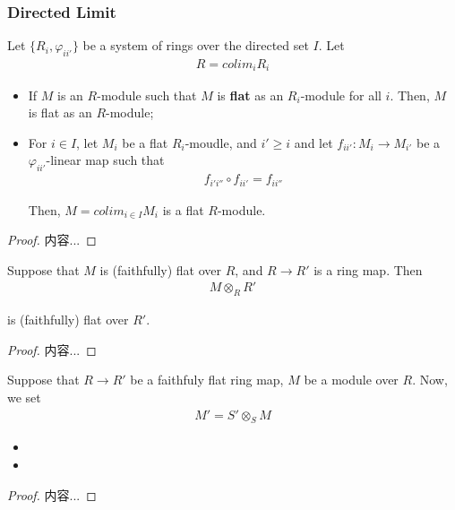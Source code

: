 \documentclass[Total.tex]{subfiles}
\begin{document}
				\subsubsection{Directed Limit}
				\begin{lemma}
					Let $\{R_i,\varphi_{ii'}\}$ be a system of rings over the directed set $I$. Let
					\begin{gather*}
						R=colim_i R_i
					\end{gather*}
					\begin{itemize}
						\item If $M$ is an $R$-module such that $M$ is \textbf{flat} as an $R_i$-module for all $i$. Then, $M$ is flat as an $R$-module;
						\item For $i\in I$, let $M_i$ be a flat $R_i$-moudle, and $i'\geq i$ and let $f_{ii'}:M_i\rightarrow M_{i'}$ be a $\varphi_{ii'}$-linear map such that
						\begin{gather*}
							f_{i'i''}\circ f_{ii'}=f_{ii''}
						\end{gather*}
						
						Then, $M=colim_{i\in I} M_i$ is a flat $R$-module.
					\end{itemize}
				\end{lemma}
				\begin{proof}
					内容...
				\end{proof}
				
				\begin{lemma}
					Suppose that $M$ is (faithfully) flat over $R$, and $R\rightarrow R'$ is a ring map. Then
					\begin{gather*}
						M\otimes_R R'
					\end{gather*}
					
					is (faithfully) flat over $R'$.
				\end{lemma}
				\begin{proof}
					内容...
				\end{proof}
				
				\begin{lemma}
					Suppose that $R\rightarrow R'$ be a faithfuly flat ring map, $M$ be a module over $R$. Now, we set
					\begin{gather*}
						M'=S'\otimes_S M
					\end{gather*}
					\begin{itemize}
						\item 
						\item 
					\end{itemize}
				\end{lemma}
				\begin{proof}
					内容...
				\end{proof}
\end{document}
